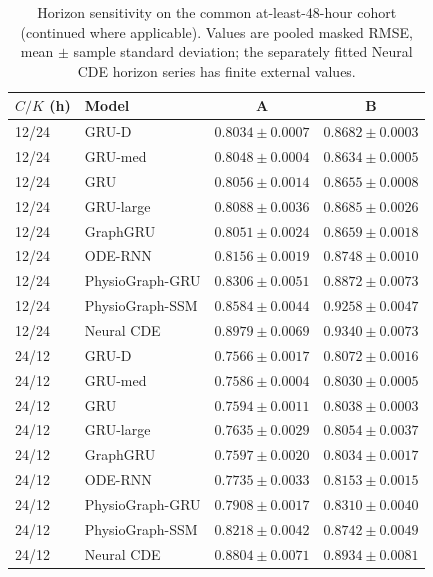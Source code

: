 \clearpage
\begin{table}[tbp]
\centering
\caption{Horizon sensitivity on the common at-least-$48$-hour cohort (continued where applicable). Values are pooled masked RMSE, mean $\pm$ sample standard deviation; the separately fitted Neural CDE horizon series has finite external values.}\label{tab:horizon18}
\small\setlength{\tabcolsep}{4pt}
\begin{tabular}{llcc}
\toprule
$C/K$ (h) 
& Model 
& A 
& B 
\\
\midrule
12/24 
& GRU-D 
& $0.8034\pm0.0007$ 
& $0.8682\pm0.0003$ 
\\
12/24 
& GRU-med 
& $0.8048\pm0.0004$ 
& $0.8634\pm0.0005$ 
\\
12/24 
& GRU 
& $0.8056\pm0.0014$ 
& $0.8655\pm0.0008$ 
\\
12/24 
& GRU-large 
& $0.8088\pm0.0036$ 
& $0.8685\pm0.0026$ 
\\
12/24 
& GraphGRU 
& $0.8051\pm0.0024$ 
& $0.8659\pm0.0018$ 
\\
12/24 
& ODE-RNN 
& $0.8156\pm0.0019$ 
& $0.8748\pm0.0010$ 
\\
12/24 
& PhysioGraph-GRU 
& $0.8306\pm0.0051$ 
& $0.8872\pm0.0073$ 
\\
12/24 
& PhysioGraph-SSM 
& $0.8584\pm0.0044$ 
& $0.9258\pm0.0047$ 
\\
12/24 
& Neural CDE 
& $0.8979\pm0.0069$ 
& $0.9340\pm0.0073$ 
\\
24/12 
& GRU-D 
& $0.7566\pm0.0017$ 
& $0.8072\pm0.0016$ 
\\
24/12 
& GRU-med 
& $0.7586\pm0.0004$ 
& $0.8030\pm0.0005$ 
\\
24/12 
& GRU 
& $0.7594\pm0.0011$ 
& $0.8038\pm0.0003$ 
\\
24/12 
& GRU-large 
& $0.7635\pm0.0029$ 
& $0.8054\pm0.0037$ 
\\
24/12 
& GraphGRU 
& $0.7597\pm0.0020$ 
& $0.8034\pm0.0017$ 
\\
24/12 
& ODE-RNN 
& $0.7735\pm0.0033$ 
& $0.8153\pm0.0015$ 
\\
24/12 
& PhysioGraph-GRU 
& $0.7908\pm0.0017$ 
& $0.8310\pm0.0040$ 
\\
24/12 
& PhysioGraph-SSM 
& $0.8218\pm0.0042$ 
& $0.8742\pm0.0049$ 
\\
24/12 
& Neural CDE 
& $0.8804\pm0.0071$ 
& $0.8934\pm0.0081$ 
\\
\bottomrule
\end{tabular}
\end{table}

